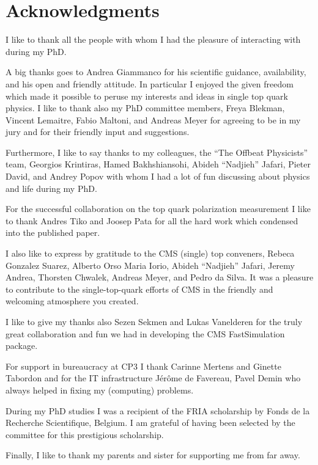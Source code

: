 \chapter*{Acknowledgments}

I like to thank all the people with whom I had the pleasure of interacting with during my PhD. 

A big thanks goes to Andrea Giammanco for his scientific guidance, availability, and his open and friendly attitude. In particular I enjoyed the given freedom which made it possible to peruse my interests and ideas in single top quark physics. I like to thank also my PhD committee members, Freya Blekman, Vincent Lemaitre, Fabio Maltoni, and Andreas Meyer for agreeing to be in my jury and for their friendly input and suggestions.

Furthermore, I like to say thanks to my colleagues, the ``The Offbeat Physicists'' team, Georgios Krintiras, Hamed Bakhshiansohi, Abideh ``Nadjieh'' Jafari, Pieter David, and Andrey Popov with whom I had a lot of fun discussing about physics and life during my PhD.

For the successful collaboration on the top quark polarization measurement I like to thank Andres Tiko and Joosep Pata for all the hard work which condensed into the published paper.

I also like to express by gratitude to the CMS (single) top conveners, Rebeca Gonzalez Suarez, Alberto Orso Maria Iorio, Abideh ``Nadjieh'' Jafari, Jeremy Andrea, Thorsten Chwalek, Andreas Meyer, and Pedro da Silva. It was a pleasure to contribute to the single-top-quark efforts of CMS in the friendly and welcoming atmosphere you created.

I like to give my thanks also Sezen Sekmen and Lukas Vanelderen for the truly great collaboration and fun we had in developing the CMS FastSimulation package.

For support in bureaucracy at CP3 I thank Carinne Mertens and Ginette Tabordon and for the IT infrastructure J\'er\^ome de Favereau, Pavel Demin who always helped in fixing my (computing) problems.

During my PhD studies I was a recipient of the FRIA scholarship by Fonds de la Recherche Scientifique, Belgium. I am grateful of having been selected by the committee for this prestigious scholarship.

Finally, I like to thank my parents and sister for supporting me from far away.
